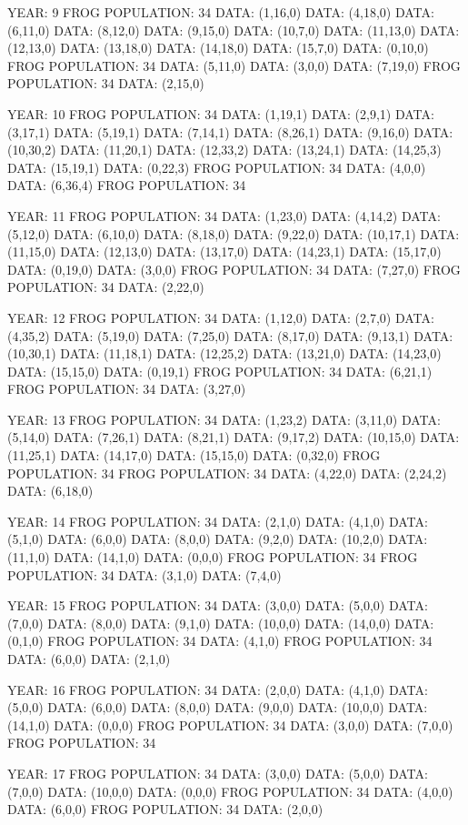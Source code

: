 \documentclass[12pt,a4paper]{article}
\begin{document}
{YEAR: 9
FROG POPULATION: 34
DATA: (1,16,0)
DATA: (4,18,0)
DATA: (6,11,0)
DATA: (8,12,0)
DATA: (9,15,0)
DATA: (10,7,0)
DATA: (11,13,0)
DATA: (12,13,0)
DATA: (13,18,0)
DATA: (14,18,0)
DATA: (15,7,0)
DATA: (0,10,0)
FROG POPULATION: 34
DATA: (5,11,0)
DATA: (3,0,0)
DATA: (7,19,0)
FROG POPULATION: 34
DATA: (2,15,0)

YEAR: 10
FROG POPULATION: 34
DATA: (1,19,1)
DATA: (2,9,1)
DATA: (3,17,1)
DATA: (5,19,1)
DATA: (7,14,1)
DATA: (8,26,1)
DATA: (9,16,0)
DATA: (10,30,2)
DATA: (11,20,1)
DATA: (12,33,2)
DATA: (13,24,1)
DATA: (14,25,3)
DATA: (15,19,1)
DATA: (0,22,3)
FROG POPULATION: 34
DATA: (4,0,0)
DATA: (6,36,4)
FROG POPULATION: 34

YEAR: 11
FROG POPULATION: 34
DATA: (1,23,0)
DATA: (4,14,2)
DATA: (5,12,0)
DATA: (6,10,0)
DATA: (8,18,0)
DATA: (9,22,0)
DATA: (10,17,1)
DATA: (11,15,0)
DATA: (12,13,0)
DATA: (13,17,0)
DATA: (14,23,1)
DATA: (15,17,0)
DATA: (0,19,0)
DATA: (3,0,0)
FROG POPULATION: 34
DATA: (7,27,0)
FROG POPULATION: 34
DATA: (2,22,0)

YEAR: 12
FROG POPULATION: 34
DATA: (1,12,0)
DATA: (2,7,0)
DATA: (4,35,2)
DATA: (5,19,0)
DATA: (7,25,0)
DATA: (8,17,0)
DATA: (9,13,1)
DATA: (10,30,1)
DATA: (11,18,1)
DATA: (12,25,2)
DATA: (13,21,0)
DATA: (14,23,0)
DATA: (15,15,0)
DATA: (0,19,1)
FROG POPULATION: 34
DATA: (6,21,1)
FROG POPULATION: 34
DATA: (3,27,0)

YEAR: 13
FROG POPULATION: 34
DATA: (1,23,2)
DATA: (3,11,0)
DATA: (5,14,0)
DATA: (7,26,1)
DATA: (8,21,1)
DATA: (9,17,2)
DATA: (10,15,0)
DATA: (11,25,1)
DATA: (14,17,0)
DATA: (15,15,0)
DATA: (0,32,0)
FROG POPULATION: 34
FROG POPULATION: 34
DATA: (4,22,0)
DATA: (2,24,2)
DATA: (6,18,0)

YEAR: 14
FROG POPULATION: 34
DATA: (2,1,0)
DATA: (4,1,0)
DATA: (5,1,0)
DATA: (6,0,0)
DATA: (8,0,0)
DATA: (9,2,0)
DATA: (10,2,0)
DATA: (11,1,0)
DATA: (14,1,0)
DATA: (0,0,0)
FROG POPULATION: 34
FROG POPULATION: 34
DATA: (3,1,0)
DATA: (7,4,0)

YEAR: 15
FROG POPULATION: 34
DATA: (3,0,0)
DATA: (5,0,0)
DATA: (7,0,0)
DATA: (8,0,0)
DATA: (9,1,0)
DATA: (10,0,0)
DATA: (14,0,0)
DATA: (0,1,0)
FROG POPULATION: 34
DATA: (4,1,0)
FROG POPULATION: 34
DATA: (6,0,0)
DATA: (2,1,0)

YEAR: 16
FROG POPULATION: 34
DATA: (2,0,0)
DATA: (4,1,0)
DATA: (5,0,0)
DATA: (6,0,0)
DATA: (8,0,0)
DATA: (9,0,0)
DATA: (10,0,0)
DATA: (14,1,0)
DATA: (0,0,0)
FROG POPULATION: 34
DATA: (3,0,0)
DATA: (7,0,0)
FROG POPULATION: 34

YEAR: 17
FROG POPULATION: 34
DATA: (3,0,0)
DATA: (5,0,0)
DATA: (7,0,0)
DATA: (10,0,0)
DATA: (0,0,0)
FROG POPULATION: 34
DATA: (4,0,0)
DATA: (6,0,0)
FROG POPULATION: 34
DATA: (2,0,0)

}
\end{document}
